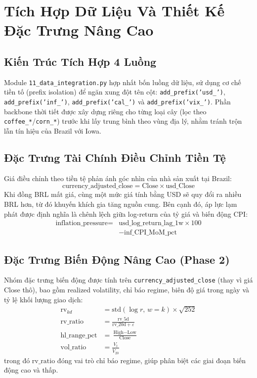 \documentclass[conference]{IEEEtran}
\begin{document}
\section{Tích Hợp Dữ Liệu Và Thiết Kế Đặc Trưng Nâng Cao}
\subsection{Kiến Trúc Tích Hợp 4 Luồng}
Module \texttt{11\_data\_integration.py} hợp nhất bốn luồng dữ liệu, sử dụng
cơ chế tiền tố (prefix isolation) để ngăn xung đột tên cột:
\texttt{add\_prefix('usd\_')}, \texttt{add\_prefix('inf\_')},
\texttt{add\_prefix('cal\_')} và \texttt{add\_prefix('vix\_')}. Phần backbone
thời tiết được xây dựng riêng cho từng loại cây (lọc theo
\texttt{coffee\_*}/\texttt{corn\_*}) trước khi lấy trung bình theo vùng địa
lý, nhằm tránh trộn lẫn tín hiệu của Brazil với Iowa.
\subsection{Đặc Trưng Tài Chính Điều Chỉnh Tiền Tệ}
Giá điều chỉnh theo tiền tệ phản ánh góc nhìn của nhà sản xuất tại Brazil:
\begin{equation}
\text{currency\_adjusted\_close} = \text{Close} \times \text{usd\_Close}
\label{eq:cac}
\end{equation}
Khi đồng BRL mất giá, cùng một mức giá tính bằng USD sẽ quy đổi ra nhiều BRL
hơn, từ đó khuyến khích gia tăng nguồn cung. Bên cạnh đó, áp lực lạm phát
được định nghĩa là chênh lệch giữa log-return của tỷ giá và biến động CPI:
\begin{equation}
\begin{aligned}
\text{inflation\_pressure} = {}
  &\text{usd\_log\_return\_lag\_1w} \times 100 \\
  &{}- \text{inf\_CPI\_MoM\_pct}
\end{aligned}
\label{eq:infpress}
\end{equation}
\subsection{Đặc Trưng Biến Động Nâng Cao (Phase 2)}
Nhóm đặc trưng biến động được tính trên \texttt{currency\_adjusted\_close}
(thay vì giá Close thô), bao gồm realized volatility, chỉ báo regime, biên độ
giá trong ngày và tỷ lệ khối lượng giao dịch:
\begin{align}
\text{rv}_{kd} &= \text{std}(\log r,\, w{=}k) \times \sqrt{252}
  \label{eq:rv} \\
\text{rv\_ratio} &= \frac{\text{rv\_5d}}{\text{rv\_20d} + \varepsilon}
  \label{eq:rvratio} \\
\text{hl\_range\_pct} &= \frac{\text{High}-\text{Low}}{\text{Close}}
  \label{eq:hlrange} \\
\text{vol\_ratio} &= \frac{V_t}{\overline{V}_{20}}
  \label{eq:volratio}
\end{align}
trong đó $\text{rv\_ratio}$ đóng vai trò chỉ báo regime, giúp phân biệt các
giai đoạn biến động cao và thấp.
\end{document}
